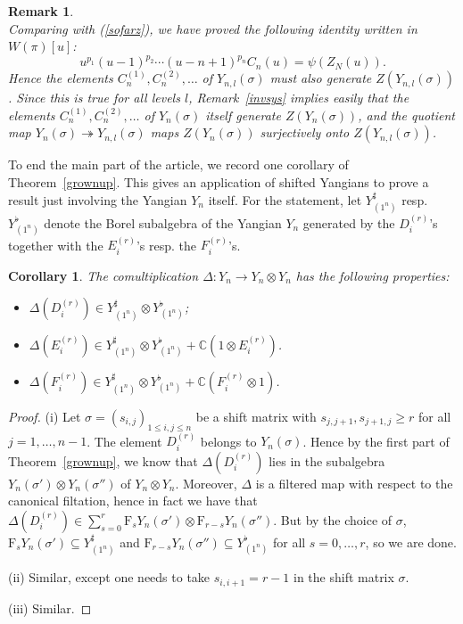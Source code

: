 \documentclass[twoside,12pt,reqno]{amsart}
\newtheorem{Corollary}[Proposition]{Corollary}
\newtheorem{Remark}[Proposition]{Remark}
\def\C{{\mathbb C}}
\def\F{\mathrm{F}}
\begin{document}
\begin{Remark}
\begin{equation}
\end{equation}
Comparing with (\ref{sofarz}), we have proved the following identity
written 
in $W(\pi)[u]$:
\begin{equation}
u^{p_1} (u-1)^{p_2} \cdots (u-n+1)^{p_n}C_n(u) = 
\psi(Z_N(u)).
\end{equation}
Hence the elements 
$C_n^{(1)},C_n^{(2)},\dots$ of $Y_{n,l}(\sigma)$ must
also generate 
$Z(Y_{n,l}(\sigma))$. Since this is true for all
levels $l$, 
Remark~\ref{invsys} implies easily that the elements
$C_n^{(1)},C_n^{(2)},\dots$ of $Y_n(\sigma)$ itself generate
$Z(Y_n(\sigma))$, and the quotient map
$Y_n(\sigma) \twoheadrightarrow Y_{n,l}(\sigma)$ maps
$Z(Y_n(\sigma))$ surjectively onto $Z(Y_{n,l}(\sigma))$.
\end{Remark}
\fi


To end the main part of the article, we record one corollary of
Theorem~\ref{grownup}. This gives an application of shifted Yangians
to prove a result just involving the Yangian $Y_n$ itself.
For the statement, let $Y_{(1^n)}^{\sharp}$ resp.
$Y_{(1^n)}^{\flat}$ denote the Borel subalgebra of the Yangian $Y_n$
generated by the $D_i^{(r)}$'s together with the $E_i^{(r)}$'s resp. the
$F_i^{(r)}$'s.

\begin{Corollary}\label{provo}
The comultiplication $\Delta:Y_n\rightarrow Y_n\otimes Y_n$
has the following properties:
\begin{itemize}
\item[(i)]
$\Delta(D_i^{(r)}) \in Y_{(1^n)}^\sharp \otimes Y_{(1^n)}^\flat$;
\item[(ii)]
$\Delta(E_i^{(r)}) \in Y_{(1^n)}^\sharp \otimes Y_{(1^n)}^\flat + \C(1 \otimes E_i^{(r)})$.
\item[(iii)]
$\Delta(F_i^{(r)}) \in Y_{(1^n)}^\sharp \otimes Y_{(1^n)}^\flat + \C(F_i^{(r)} \otimes 1)$.
\end{itemize}
\end{Corollary}

\begin{proof}
(i) Let $\sigma = (s_{i,j})_{1 \leq i,j \leq n}$ be a shift matrix with 
$s_{j,j+1}, s_{j+1,j} \geq r$ for all $j=1,\dots,n-1$.
The element $D_i^{(r)}$ belongs to $Y_n(\sigma)$.
Hence by the first part of Theorem~\ref{grownup}, 
we know that $\Delta(D_i^{(r)})$ lies in the subalgebra
$Y_n(\sigma') \otimes Y_n(\sigma'')$ of $Y_n \otimes Y_n$. 
Moreover, $\Delta$ is a filtered map 
with respect to
the canonical filtation, hence in fact we have that
$\Delta(D_i^{(r)})  \in \sum_{s=0}^r \F_s Y_n(\sigma') \otimes \F_{r-s}
Y_n(\sigma'')$.
But by the choice of $\sigma$, $\F_s Y_n(\sigma') \subseteq Y_{(1^n)}^\sharp$
and $\F_{r-s} Y_n(\sigma'') \subseteq Y_{(1^n)}^\flat$ for all $s=0,\dots,r$,
so we are done.

(ii) Similar,
except one needs to take $s_{i,i+1}=r-1$ in the shift matrix $\sigma$.

(iii) Similar.
\end{proof}
\end{document}
